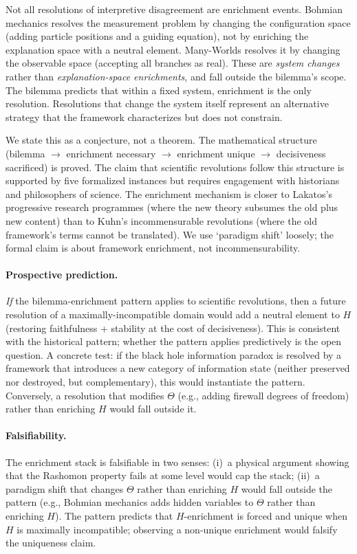 \documentclass[11pt,a4paper]{article}
\begin{document}
Not all resolutions of interpretive disagreement are enrichment events. Bohmian mechanics resolves the measurement problem by changing the configuration space (adding particle positions and a guiding equation), not by enriching the explanation space with a neutral element. Many-Worlds resolves it by changing the observable space (accepting all branches as real). These are \emph{system changes} rather than \emph{explanation-space enrichments}, and fall outside the bilemma's scope. The bilemma predicts that within a fixed system, enrichment is the only resolution. Resolutions that change the system itself represent an alternative strategy that the framework characterizes but does not constrain.

We state this as a conjecture, not a theorem. The mathematical structure
(bilemma $\to$ enrichment necessary $\to$ enrichment unique $\to$ decisiveness
sacrificed) is proved. The claim that scientific revolutions follow this
structure is supported by five formalized instances but requires engagement
with historians and philosophers of science.  The enrichment mechanism is closer to Lakatos's progressive research programmes (where the new theory subsumes the old plus new content) than to Kuhn's incommensurable revolutions (where the old framework's terms cannot be translated). We use `paradigm shift' loosely; the formal claim is about framework enrichment, not incommensurability.

\paragraph{Prospective prediction.}
\emph{If} the bilemma-enrichment pattern applies to scientific revolutions, then a future resolution of a maximally-incompatible domain would add a neutral element to $H$ (restoring faithfulness + stability at the cost of decisiveness).  This is consistent with the historical pattern; whether the pattern applies predictively is the open question.  A concrete test: if the black hole information paradox is resolved by a framework that introduces a new category of information state (neither preserved nor destroyed, but complementary), this would instantiate the pattern. Conversely, a resolution that modifies $\Theta$ (e.g., adding firewall degrees of freedom) rather than enriching $H$ would fall outside it.

\paragraph{Falsifiability.}
The enrichment stack is falsifiable in two senses: (i)~a physical argument showing that the Rashomon property fails at some level would cap the stack; (ii)~a paradigm shift that changes $\Theta$ rather than enriching $H$ would fall outside the pattern (e.g., Bohmian mechanics adds hidden variables to $\Theta$ rather than enriching $H$). The pattern predicts that $H$-enrichment is forced and unique when $H$ is maximally incompatible; observing a non-unique enrichment would falsify the uniqueness claim.
\end{document}
